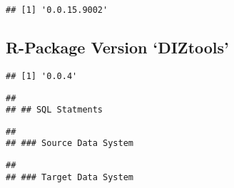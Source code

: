 \documentclass[
]{article}
\begin{document}
\begin{verbatim}
## [1] '0.0.15.9002'
\end{verbatim}

\hypertarget{r-package-version-diztools}{%
\subsection{R-Package Version
`DIZtools'}\label{r-package-version-diztools}}

\begin{verbatim}
## [1] '0.0.4'
\end{verbatim}

\begin{verbatim}
## 
## ## SQL Statments
\end{verbatim}

\begin{verbatim}
## 
## ### Source Data System
\end{verbatim}

\begin{verbatim}
## 
## ### Target Data System
\end{verbatim}
\end{document}
